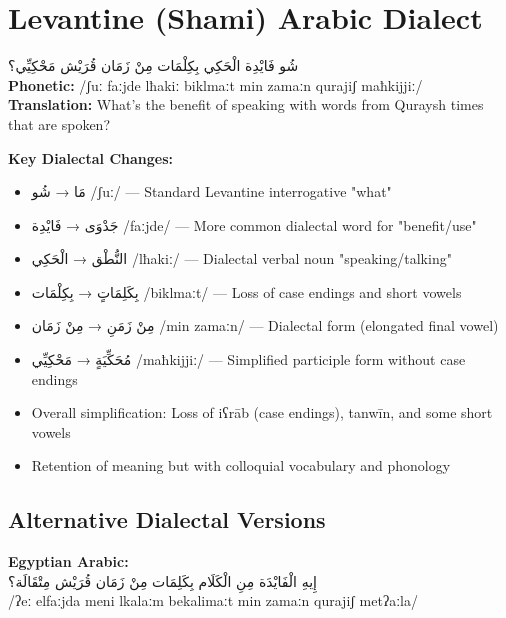 \documentclass[letterpaper,12pt]{article}
\begin{document}
\section{Levantine (Shami) Arabic Dialect}

\begin{tcolorbox}[colback=white,colframe=dialectcolor,title=\textbf{Levantine Version},breakable]
\textarabic{شُو فَايْدِة الْحَكِي بِكِلْمَات مِنْ زَمَان قُرَيْش مَحْكِيِّي؟}\\[0.5em]
\textbf{Phonetic:} /ʃuː faːjde lħakiː biklmaːt min zamaːn qurajiʃ maħkijjiː/\\[0.5em]
\textbf{Translation:} What's the benefit of speaking with words from Quraysh times that are spoken?
\end{tcolorbox}

\textbf{Key Dialectal Changes:}
\begin{itemize}
\item \textarabic{مَا} → \textarabic{شُو} /ʃuː/ — Standard Levantine interrogative "what"
\item \textarabic{جَدْوَى} → \textarabic{فَايْدِة} /faːjde/ — More common dialectal word for "benefit/use"
\item \textarabic{النُّطْق} → \textarabic{الْحَكِي} /lħakiː/ — Dialectal verbal noun "speaking/talking"
\item \textarabic{بِكَلِمَاتٍ} → \textarabic{بِكِلْمَات} /biklmaːt/ — Loss of case endings and short vowels
\item \textarabic{مِنْ زَمَنِ} → \textarabic{مِنْ زَمَان} /min zamaːn/ — Dialectal form (elongated final vowel)
\item \textarabic{مُحَكِّيَةٍ} → \textarabic{مَحْكِيِّي} /maħkijjiː/ — Simplified participle form without case endings
\item Overall simplification: Loss of iʕrāb (case endings), tanwīn, and some short vowels
\item Retention of meaning but with colloquial vocabulary and phonology
\end{itemize}

\subsection{Alternative Dialectal Versions}

\textbf{Egyptian Arabic:}\\
\textarabic{إِيهِ الْفَايْدَة مِنِ الْكَلَام بِكَلِمَات مِنْ زَمَان قُرَيْش مِتْقَالَة؟}\\
/ʔeː elfaːjda meni lkalaːm bekalimaːt min zamaːn qurajiʃ metʔaːla/
\end{document}
